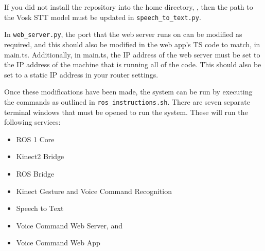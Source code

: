 If you did not install the repository into the home directory, \texttt{\customtilde}, then the path to the Vosk STT model must be updated in \texttt{speech\_to\_text.py}.

In \texttt{web\_server.py}, the port that the web server runs on can be modified as required, and this should also be modified in the web app's TS code to match, in main.ts.
Additionally, in main.ts, the IP address of the web server must be set to the IP address of the machine that is running all of the code.
This should also be set to a static IP address in your router settings.

Once these modifications have been made, the system can be run by executing the commands as outlined in \texttt{ros\_instructions.sh}.
There are seven separate terminal windows that must be opened to run the system.
These will run the following services:

\begin{itemize}
    \item ROS 1 Core
    \item Kinect2 Bridge
    \item ROS Bridge
    \item Kinect Gesture and Voice Command Recognition
    \item Speech to Text
    \item Voice Command Web Server, and
    \item Voice Command Web App
\end{itemize}